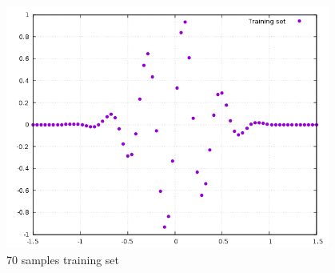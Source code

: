 \documentclass[12pt, a4paper]{report}
\theoremstyle{definition}
\begin{document}
\begin{figure}[H]
	\centering
	\includegraphics[width=0.95\textwidth]{img/TrainingSet70}
	\caption{70 samples training set}
\end{figure}
\newpage
\end{document}
